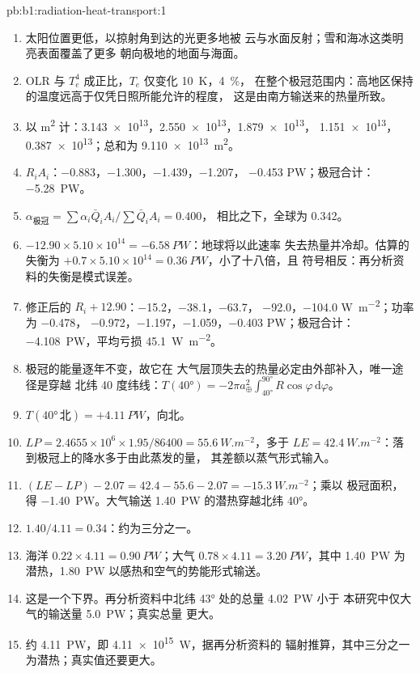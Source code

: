 \begin{solution}{pb:b1:radiation-heat-transport:1}
\begin{enumerate}
  \item 太阳位置更低，以掠射角到达的光更多地被
        云与水面反射；雪和海冰这类明亮表面覆盖了更多
        朝向极地的地面与海面。
  \item OLR 与 $T_e^4$ 成正比，$T_e$ 仅变化 \qty{10}{K}，\qty{4}{\percent}，
        在整个极冠范围内：高地区保持的温度远高于仅凭日照所能允许的程度，
        这是由南方输送来的热量所致。
  \item 以 \unit{m^2} 计：\num{3.143e13}，\num{2.550e13}，\num{1.879e13}，
        \num{1.151e13}，\num{0.387e13}；总和为 \qty{9.110e13}{m^2}。
  \item $R_iA_i$：\num{-0.883}，\num{-1.300}，\num{-1.439}，\num{-1.207}，
        \num{-0.453} \unit{PW}；极冠合计：\qty{-5.28}{PW}。
  \item $\alpha_\text{极冠} = \sum\alpha_i\bar Q_iA_i/\sum\bar Q_iA_i = 0.400$，
        相比之下，全球为 \num{0.342}。
  \item $-12.90 \times 5.10\times10^{14} = \qty{-6.58}{PW}$：地球将以此速率
        失去热量并冷却。估算的失衡为
        $+0.7 \times 5.10\times10^{14} = \qty{+0.36}{PW}$，小了十八倍，且
        符号相反：再分析资料的失衡是模式误差。
  \item 修正后的 $R_i + 12.90$：\num{-15.2}，\num{-38.1}，\num{-63.7}，
        \num{-92.0}，\num{-104.0} \unit{W.m^{-2}}；功率为 \num{-0.478}，
        \num{-0.972}，\num{-1.197}，\num{-1.059}，\num{-0.403} \unit{PW}；极冠合计：
        \qty{-4.108}{PW}，平均亏损 \qty{45.1}{W.m^{-2}}。
  \item 极冠的能量逐年不变，故它在
        大气层顶失去的热量必定由外部补入，唯一途径是穿越
        北纬 40 度纬线：$T(\ang{40}) = -2\pi a_\oplus^2\int_{\ang{40}}^{\ang{90}}
        R\cos\varphi\,\mathrm d\varphi$。
  \item $T(\ang{40}\,\text{北}) = +\qty{4.11}{PW}$，向北。
  \item $LP = 2.4655\times10^6 \times 1.95/86400 = \qty{55.6}{W.m^{-2}}$，多于
        $LE = \qty{42.4}{W.m^{-2}}$：落到极冠上的降水多于由此蒸发的量，
        其差额以蒸气形式输入。
  \item $(LE - LP) - 2.07 = 42.4 - 55.6 - 2.07 = \qty{-15.3}{W.m^{-2}}$；乘以
        极冠面积，得 \qty{-1.40}{PW}。大气输送 \qty{1.40}{PW}
        的潜热穿越北纬 \ang{40}。
  \item $1.40/4.11 = 0.34$：约为三分之一。
  \item 海洋 $0.22 \times 4.11 = \qty{0.90}{PW}$；大气 $0.78 \times 4.11 =
        \qty{3.20}{PW}$，其中 \qty{1.40}{PW} 为潜热，\qty{1.80}{PW}
        以感热和空气的势能形式输送。
  \item 这是一个下界。再分析资料中北纬 \ang{43} 处的总量 \qty{4.02}{PW} 小于
        本研究中仅大气的输送量 \qty{5.0}{PW}；真实总量
        更大。
  \item 约 \qty{4.11}{PW}，即 \qty{4.11e15}{W}，据再分析资料的
        辐射推算，其中三分之一为潜热；真实值还要更大。
\end{enumerate}
\end{solution}
